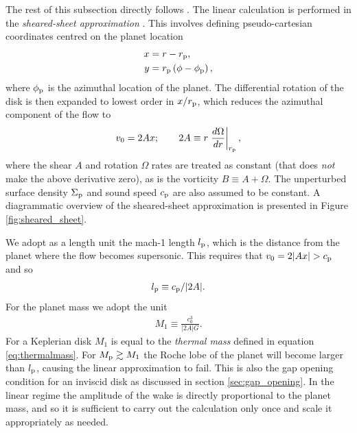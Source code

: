 The rest of this subsection directly follows \citet{goodman2001}. 
The linear calculation is performed in the \textit{sheared-sheet approximation} \citep{hill1878,goldreich1965}.
This involves defining pseudo-cartesian coordinates centred on the planet location
\begin{align}
    x &= r - r_{\rm p}, \label{eq:local_x} \\
    y &= r_{\rm p} \left( \phi - \phi_{\rm p} \right), \label{eq:local_y}
\end{align}
where $\phi_{\rm p}$ is the azimuthal location of the planet.
The differential rotation of the disk is then expanded to lowest order in $x/r_{\rm p}$, which reduces the azimuthal component of the flow to
\begin{align}
    v_0 = 2 A x; \qquad 2A \equiv r \left. \frac{d \Omega}{dr} \right|_{r_{\rm p}},
\end{align}
where the shear $A$ and rotation $\Omega$ rates are treated as constant (that does \textit{not} make the above derivative zero), as is the vorticity $B \equiv A+\Omega$.
The unperturbed surface density $\Sigma_{\rm p}$ and sound speed $c_{\rm p}$ are also assumed to be constant.
A diagrammatic overview of the sheared-sheet approximation is presented in Figure \ref{fig:sheared_sheet}.

We adopt as a length unit the mach-1 length $l_{\rm p}$, which is the distance from the planet where the flow becomes supersonic.
This requires that $v_0 = 2|Ax| > c_{\rm p}$ and so 
\begin{align}
    l_{\rm p} \equiv c_{\rm p} / |2A|. \label{eq:mach1_len}
\end{align}
For the planet mass we adopt the unit
\begin{align}
    M_1 \equiv \frac{c_0^3}{|2A|G}. \label{eq:char_mass}
\end{align}
For a Keplerian disk $M_1$ is equal to the \textit{thermal mass} defined in equation \ref{eq:thermalmass}.
For $M_{\rm p} \gtrsim M_1$ the Roche lobe of the planet will become larger than $l_{\rm p}$, causing the linear approximation to fail.
This is also the gap opening condition for an inviscid disk as discussed in section \ref{sec:gap_opening}.
In the linear regime the amplitude of the wake is directly proportional to the planet mass, and so it is sufficient to carry out the calculation only once and scale it appropriately as needed.


